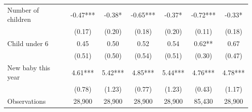 \begin{tabular}{lcccccc}
Number of children & -0.47*** & -0.38* & -0.65*** & -0.37* & -0.72*** & -0.33* \\
 & (0.17) & (0.20) & (0.18) & (0.20) & (0.11) & (0.18) \\
Child under 6 & 0.45 & 0.50 & 0.52 & 0.54 & 0.62** & 0.67 \\
 & (0.51) & (0.50) & (0.54) & (0.51) & (0.30) & (0.47) \\
New baby this year & 4.61*** & 5.42*** & 4.85*** & 5.44*** & 4.76*** & 4.78*** \\
 & (0.78) & (1.23) & (0.77) & (1.23) & (0.43) & (1.17) \\
\midrule
Observations & 28,900 & 28,900 & 28,900 & 28,900 & 85,430 & 28,900 \\
\bottomrule
\end{tabular}
